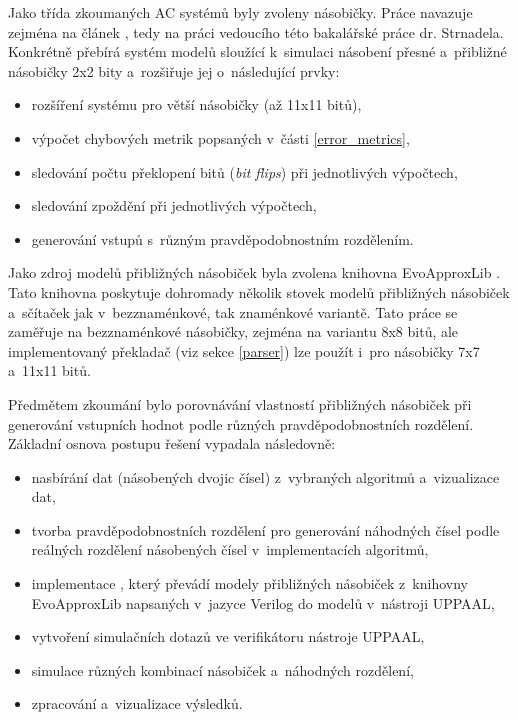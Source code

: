 Jako třída zkoumaných AC systémů byly zvoleny násobičky. Práce navazuje zejména na článek \cite{smc_axc}, tedy na práci vedoucího této bakalářské práce dr. Strnadela. Konkrétně přebírá systém modelů sloužící k~simulaci násobení přesné a~přibližné násobičky 2x2 bity a~rozšiřuje jej o~následující prvky:
\begin{itemize}
    \item rozšíření systému pro větší násobičky (až 11x11 bitů),
    \item výpočet chybových metrik popsaných v~části \ref{error_metrics},
    \item sledování počtu překlopení bitů (\textit{bit flips}) při jednotlivých výpočtech,
    \item sledování zpoždění při jednotlivých výpočtech,
    \item generování vstupů s~různým pravděpodobnostním rozdělením.
\end{itemize}

Jako zdroj modelů přibližných násobiček byla zvolena knihovna EvoApproxLib \cite{circuit_library}. Tato knihovna poskytuje dohromady několik stovek modelů přibližných násobiček a~sčítaček jak v~bezznaménkové, tak znaménkové variantě. Tato práce se zaměřuje na bezznaménkové násobičky, zejména na variantu 8x8 bitů, ale implementovaný překladač (viz sekce \ref{parser}) lze použít i~pro násobičky 7x7 a~11x11 bitů.

\bigskip

Předmětem zkoumání bylo porovnávání vlastností přibližných násobiček při generování vstupních hodnot podle různých pravděpodobnostních rozdělení. Základní osnova postupu řešení vypadala následovně:

\begin{itemize}
    \item nasbírání dat (násobených dvojic čísel) z~vybraných algoritmů a~vizualizace dat,
    \item tvorba pravděpodobnostních rozdělení pro generování náhodných čísel podle reálných rozdělení násobených čísel v~implementacích algoritmů,
    \item implementace , který převádí modely přibližných násobiček z~knihovny EvoApproxLib \cite{circuit_library} napsaných v~jazyce Verilog do modelů v~nástroji UPPAAL,
    \item vytvoření simulačních dotazů ve verifikátoru nástroje UPPAAL,
    \item simulace různých kombinací násobiček a~náhodných rozdělení, 
    \item zpracování a~vizualizace výsledků.
\end{itemize}

